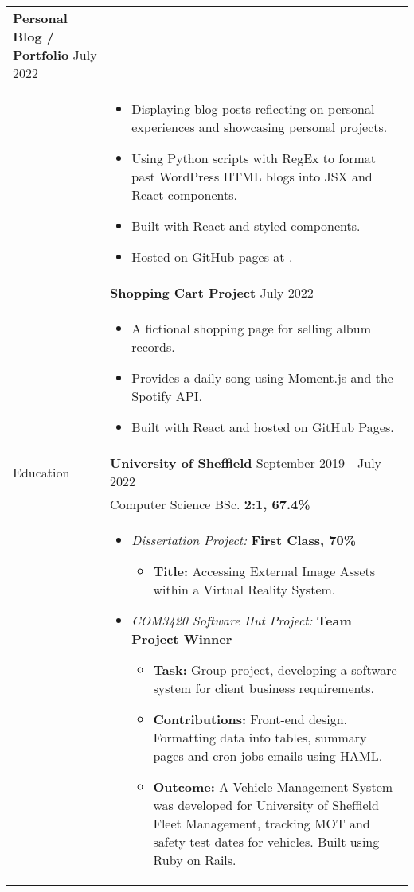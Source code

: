 \documentclass[12pt]{article}
\begin{document}
\begin{minipage}[t][0pt]{\linewidth}
\begin{tabular}[t]{p{2cm} p{14cm}}
		\textbf{Personal Blog / Portfolio}  \hfill July 2022 \\ &
		\begin{itemize}
			\renewcommand{\labelitemi}{$\diamond$}
			\item Displaying blog posts reflecting on personal experiences and showcasing personal projects.
			\item Using Python scripts with RegEx to format past WordPress HTML blogs into JSX and React components.
			\item Built with React and styled components. 
			\item Hosted on GitHub pages at \href{https://jluong23.github.io/blog}{\color{Blue}{jluong23.github.io/blog}}.
		\end{itemize} \\ &
		
		\textbf{Shopping Cart Project}  \hfill July 2022 \\ &
		\begin{itemize}
			\renewcommand{\labelitemi}{$\diamond$}
			\item A fictional shopping page for selling album records. 
			\item Provides a daily song using Moment.js and the Spotify API.
			\item Built with React and hosted on GitHub Pages.
		\end{itemize} \\
	{Education} &
		\textbf{University of Sheffield} \hfill September 2019 - July 2022 \\ &
		Computer Science BSc. \hfill \textbf{2:1, 67.4\%}  \\ &
	    \begin{itemize}
    		\renewcommand{\labelitemi}{$\diamond$}
			\item \textit{Dissertation Project:} \hfill \textbf{First Class, 70\%} 
			\begin{itemize}
				\renewcommand{\labelitemii}{$\cdot$}
				\item \textbf{Title:} Accessing External Image Assets within a Virtual Reality System.
			\end{itemize}
			\item \textit{COM3420 Software Hut Project:} \hfill \textbf{Team Project Winner} 
			\begin{itemize}
				\renewcommand{\labelitemii}{$\cdot$}
				\item \textbf{Task:} Group project, developing a software system for client business requirements.
				\item \textbf{Contributions:} Front-end design. Formatting data into tables, summary pages and cron jobs emails using HAML. 
				\item \textbf{Outcome:} A Vehicle Management System was developed for University of Sheffield Fleet Management, tracking MOT and safety test
				dates for vehicles. Built using Ruby on Rails.
			\end{itemize}
		\end{itemize} \\
\end{tabular}
\end{minipage}
\end{document}
